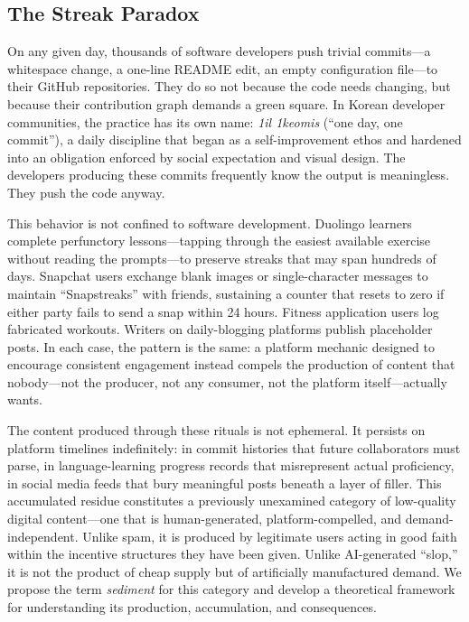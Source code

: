 \documentclass[12pt]{article}
\begin{document}
\subsection{The Streak Paradox}
\label{sec:streak-paradox}

On any given day, thousands of software developers push trivial commits---a whitespace change, a one-line README edit, an empty configuration file---to their GitHub repositories. They do so not because the code needs changing, but because their contribution graph demands a green square. In Korean developer communities, the practice has its own name: \emph{1il 1keomis} (``one day, one commit''), a daily discipline that began as a self-improvement ethos and hardened into an obligation enforced by social expectation and visual design. The developers producing these commits frequently know the output is meaningless. They push the code anyway.

This behavior is not confined to software development. Duolingo learners complete perfunctory lessons---tapping through the easiest available exercise without reading the prompts---to preserve streaks that may span hundreds of days. Snapchat users exchange blank images or single-character messages to maintain ``Snapstreaks'' with friends, sustaining a counter that resets to zero if either party fails to send a snap within 24 hours. Fitness application users log fabricated workouts. Writers on daily-blogging platforms publish placeholder posts. In each case, the pattern is the same: a platform mechanic designed to encourage consistent engagement instead compels the production of content that nobody---not the producer, not any consumer, not the platform itself---actually wants.

The content produced through these rituals is not ephemeral. It persists on platform timelines indefinitely: in commit histories that future collaborators must parse, in language-learning progress records that misrepresent actual proficiency, in social media feeds that bury meaningful posts beneath a layer of filler. This accumulated residue constitutes a previously unexamined category of low-quality digital content---one that is human-generated, platform-compelled, and demand-independent. Unlike spam, it is produced by legitimate users acting in good faith within the incentive structures they have been given. Unlike AI-generated ``slop,'' it is not the product of cheap supply but of artificially manufactured demand. We propose the term \emph{sediment} for this category and develop a theoretical framework for understanding its production, accumulation, and consequences.
\end{document}
